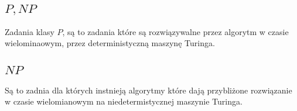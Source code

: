 \documentclass[11pt]{article}
\begin{document}
\subsection{\(P, NP\)}
\label{sec:org6cb14f0}
Zadania klasy \(P\), są to zadania które są rozwiązywalne przez algorytm w czasie wielominaowym, przez deterministyczną maszynę Turinga.

\subsection{\(NP\)}
\label{sec:orgaf14442}
Są to zadnia dla których instnieją algorytmy które dają przybliżone rozwiązanie w czasie wielomianowym na niedetermistycznej maszynie Turinga.
\end{document}
